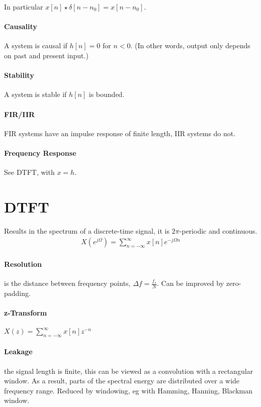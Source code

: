 \documentclass{article}
\begin{document}
\begin{multicols}{2}
    In particular $x[n] \star \delta[n - n_0] = x[n - n_0]$.

    \paragraph{Causality} A system is causal if $h[n] = 0$ for $n < 0$. (In other words, output only depends on past and present input.)

    \paragraph{Stability} A system is stable if $h[n]$ is bounded.

    \paragraph{FIR/IIR} FIR systems have an impulse response of finite length, IIR systems do not.

    \paragraph{Frequency Response} See DTFT, with $x = h$.

    \section*{DTFT}

    Results in the spectrum of a discrete-time signal, it is $2\pi$-periodic and continuous.
    \begin{align*}
        X(e^{j\Omega}) = \sum_{n = -\infty}^{\infty} x[n] e^{-j\Omega n}
    \end{align*}

    \paragraph{Resolution} is the distance between frequency points, $\Delta f = \frac{f_s}{N}$. Can be improved by zero-padding.

    \paragraph{z-Transform} $X(z) = \sum_{n = -\infty}^{\infty} x[n] z^{-n}$

    \paragraph{Leakage} the signal length is finite, this can be viewed as a convolution with a rectangular window. As a result, parts of the spectral energy are distributed over a wide frequency range. Reduced by windowing, eg with Hamming, Hanning, Blackman window.


\end{multicols}
\end{document}
